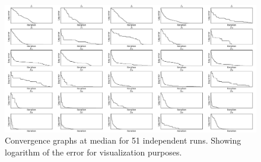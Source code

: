 \documentclass[graybox]{svmult}
\begin{document}
\begin{figure}[!ht]
\includegraphics[width=\linewidth]{img/converg.pdf}
\caption{Convergence graphs at median for 51 independent runs. Showing logarithm 
of the error for visualization purposes.}
\label{fig:converg}       %
\end{figure}
\end{document}
